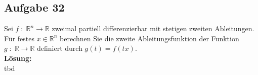 \subsection*{Aufgabe 32}

   Sei $f \; : \; \mathbb{R}^n \rightarrow \mathbb{R}$ zweimal partiell differenzierbar mit stetigen 
   zweiten Ableitungen. Für festes $x \in \mathbb{R}^n$ berechnen Sie die zweite Ableitungsfunktion der
   Funktion $g \; : \; \mathbb{R} \rightarrow \mathbb{R}$ definiert durch $g(t) = f(tx)$.\\

\textbf{Lösung:}\\
   tbd
